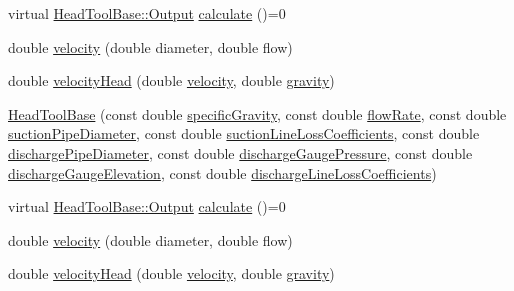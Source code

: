 \begin{DoxyCompactItemize}
\item 
virtual \hyperlink{struct_head_tool_base_1_1_output}{Head\+Tool\+Base\+::\+Output} \hyperlink{class_head_tool_base_a82024c0ce01699aa24509c964267c392}{calculate} ()=0
\item 
double \hyperlink{class_head_tool_base_a0412306c4adda62e5840342b0d26ac06}{velocity} (double diameter, double flow)
\item 
double \hyperlink{class_head_tool_base_a461c3d53a92763ca08c9a5bbcbef83c3}{velocity\+Head} (double \hyperlink{class_head_tool_base_a0412306c4adda62e5840342b0d26ac06}{velocity}, double \hyperlink{class_head_tool_base_a687da90a9c2f44cb51061d9fad30c002}{gravity})
\item 
\hyperlink{class_head_tool_base_ae5bb2325e1266c64b16937d964aea14f}{Head\+Tool\+Base} (const double \hyperlink{class_head_tool_base_ae5af2380fb5db2c25281ef663a5fb65f}{specific\+Gravity}, const double \hyperlink{class_head_tool_base_acf4c03cb62cbf63aba017ce063989fbc}{flow\+Rate}, const double \hyperlink{class_head_tool_base_a357365fc5ef346ce7bcb089c9d1a95e1}{suction\+Pipe\+Diameter}, const double \hyperlink{class_head_tool_base_ac74c6f6f8ab387efe7b77e0ce6ecd84e}{suction\+Line\+Loss\+Coefficients}, const double \hyperlink{class_head_tool_base_a126a397bd3d87b68864e1962c70bb45e}{discharge\+Pipe\+Diameter}, const double \hyperlink{class_head_tool_base_a39c854f13b16967e02a67cd1aaee07c4}{discharge\+Gauge\+Pressure}, const double \hyperlink{class_head_tool_base_a9ed2160992f8da2e335d919cf9aedd08}{discharge\+Gauge\+Elevation}, const double \hyperlink{class_head_tool_base_a147c035c7422406c594c5fd42ab11eb0}{discharge\+Line\+Loss\+Coefficients})
\item 
virtual \hyperlink{struct_head_tool_base_1_1_output}{Head\+Tool\+Base\+::\+Output} \hyperlink{class_head_tool_base_a82024c0ce01699aa24509c964267c392}{calculate} ()=0
\item 
double \hyperlink{class_head_tool_base_a0412306c4adda62e5840342b0d26ac06}{velocity} (double diameter, double flow)
\item 
double \hyperlink{class_head_tool_base_a461c3d53a92763ca08c9a5bbcbef83c3}{velocity\+Head} (double \hyperlink{class_head_tool_base_a0412306c4adda62e5840342b0d26ac06}{velocity}, double \hyperlink{class_head_tool_base_a687da90a9c2f44cb51061d9fad30c002}{gravity})
\end{DoxyCompactItemize}
